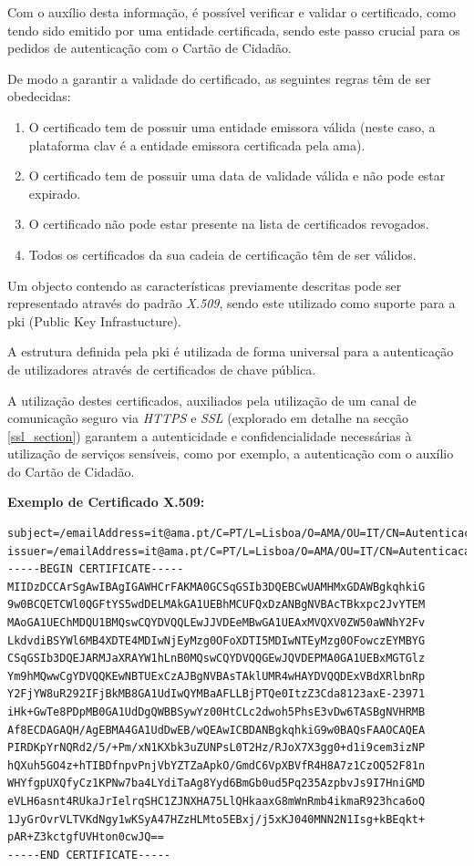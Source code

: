 Com o auxílio desta informação, é possível verificar e validar o certificado, como tendo sido emitido por uma entidade certificada, sendo este passo crucial para os pedidos de autenticação com o Cartão de Cidadão.

De modo a garantir a validade do certificado, as seguintes regras têm de ser obedecidas:

\begin{enumerate}
    \item O certificado tem de possuir uma entidade emissora válida (neste caso, a plataforma \gls{clav} é a entidade emissora certificada pela \gls{ama}).
    \item O certificado tem de possuir uma data de validade válida e não pode estar expirado.
    \item O certificado não pode estar presente na lista de certificados revogados.
    \item Todos os certificados da sua cadeia de certificação têm de ser válidos.
\end{enumerate}

Um objecto contendo as características previamente descritas pode ser representado através do padrão \emph{X.509}, sendo este utilizado como suporte para a \gls{pki} (Public Key Infrastucture).

A estrutura definida pela \gls{pki} é utilizada de forma universal para a autenticação de utilizadores através de certificados de chave pública.\cite{pki}

A utilização destes certificados, auxiliados pela utilização de um canal de comunicação seguro via \emph{HTTPS} e \emph{SSL} (explorado em detalhe na secção \ref{ssl_section}) garantem a autenticidade e confidencialidade necessárias à utilização de serviços sensíveis, como por exemplo, a autenticação com o auxílio do Cartão de Cidadão.

\vspace{10mm}
\textbf{Exemplo de Certificado X.509:}
\begin{verbatim}
subject=/emailAddress=it@ama.pt/C=PT/L=Lisboa/O=AMA/OU=IT/CN=Autenticacao.Gov
issuer=/emailAddress=it@ama.pt/C=PT/L=Lisboa/O=AMA/OU=IT/CN=Autenticacao.Gov
-----BEGIN CERTIFICATE-----
MIIDzDCCArSgAwIBAgIGAWHCrFAKMA0GCSqGSIb3DQEBCwUAMHMxGDAWBgkqhkiG
9w0BCQETCWl0QGFtYS5wdDELMAkGA1UEBhMCUFQxDzANBgNVBAcTBkxpc2JvYTEM
MAoGA1UEChMDQU1BMQswCQYDVQQLEwJJVDEeMBwGA1UEAxMVQXV0ZW50aWNhY2Fv
LkdvdiBSYWl6MB4XDTE4MDIwNjEyMzg0OFoXDTI5MDIwNTEyMzg0OFowczEYMBYG
CSqGSIb3DQEJARMJaXRAYW1hLnB0MQswCQYDVQQGEwJQVDEPMA0GA1UEBxMGTGlz
Ym9hMQwwCgYDVQQKEwNBTUExCzAJBgNVBAsTAklUMR4wHAYDVQQDExVBdXRlbnRp
Y2FjYW8uR292IFjBkMB8GA1UdIwQYMBaAFLLBjPTQe0ItzZ3Cda8123axE-23971
iHk+GwTe8PDpMB0GA1UdDgQWBBSywYz00HtCLc2dwoh5PhsE3vDw6TASBgNVHRMB
Af8ECDAGAQH/AgEBMA4GA1UdDwEB/wQEAwICBDANBgkqhkiG9w0BAQsFAAOCAQEA
PIRDKpYrNQRd2/5/+Pm/xN1KXbk3uZUNPsL0T2Hz/RJoX7X3gg0+d1i9cem3izNP
hQXuh5GO4z+hTIBDfnpvPnjVbYZTZaApkO/GmdC6VpXBVfR4H8A7z1CzOQ52F81n
WHYfgpUXQfyCz1KPNw7ba4LYdiTaAg8Yyd6BmGb0ud5Pq235AzpbvJs9I7HniGMD
eVLH6asnt4RUkaJrIelrqSHC1ZJNXHA75LlQHkaaxG8mWnRmb4ikmaR923hca6oQ
1JyGrOvrVLTVKdNgy1wKSyA47HZzHLMto5EBxj/j5xKJ040MNN2N1Isg+kBEqkt+
pAR+Z3kctgfUVHton0cwJQ==
-----END CERTIFICATE-----
\end{verbatim}

